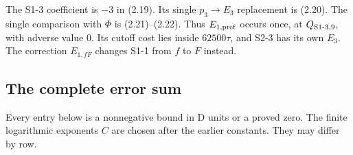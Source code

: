 The S1-3 coefficient is $-3$ in (2.19).
Its single $p_3\to E_3$ replacement is (2.20).
The single comparison with $\Phi$ is (2.21)--(2.22).
Thus $E_{1,\rm pref}$ occurs once, at $Q_{\rm S1\text{-}3,9}$, with adverse value $0$.
Its cutoff cost lies inside $62500\tau$, and S2-3 has its own $E_3$.
The correction $E_{1,fF}$ changes S1-1 from $f$ to $F$ instead.

\subsection{The complete error sum}

Every entry below is a nonnegative bound in D units or a proved zero.
The finite logarithmic exponents $C$ are chosen after the earlier constants.
They may differ by row.
\begingroup\small
\setlength{\tabcolsep}{3pt}
\renewcommand{\arraystretch}{1.15}
